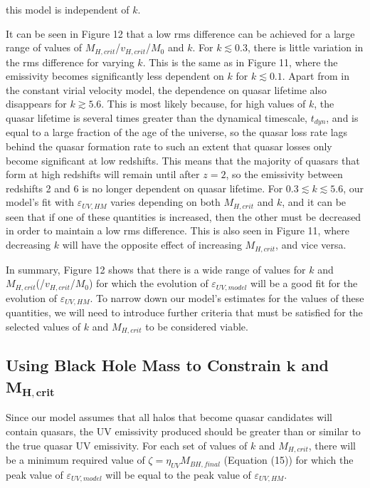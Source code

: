 \documentclass[12pt, twocolumn]{article}%
\begin{document}
\noindent this model is independent of $k$.\par

It can be seen in Figure 12 that a low rms difference can be achieved for a large range of values of $M_{H,crit}$/$v_{H,crit}$/$M_0$ and $k$. For $k\lesssim0.3$, there is little variation in the rms difference for varying $k$. This is the same as in Figure 11, where the emissivity becomes significantly less dependent on $k$ for $k\lesssim0.1$. Apart from in the constant virial velocity model, the dependence on quasar lifetime also disappears for $k\gtrsim5.6$. This is most likely because, for high values of $k$, the quasar lifetime is several times greater than the dynamical timescale, $t_{dyn}$, and is equal to a large fraction of the age of the universe, so the quasar loss rate lags behind the quasar formation rate to such an extent that quasar losses only become significant at low redshifts. This means that the majority of quasars that form at high redshifts will remain until after $z=2$, so the emissivity between redshifts 2 and 6 is no longer dependent on quasar lifetime. For $0.3\lesssim k\lesssim5.6$, our model's fit with $\varepsilon_{UV,HM}$ varies depending on both $M_{H,crit}$ and $k$, and it can be seen that if one of these quantities is increased, then the other must be decreased in order to maintain a low rms difference. This is also seen in Figure 11, where decreasing $k$ will have the opposite effect of increasing $M_{H,crit}$, and vice versa.\par

In summary, Figure 12 shows that there is a wide range of values for $k$ and $M_{H,crit}$(/$v_{H,crit}$/$M_0$) for which the evolution of $\varepsilon_{UV,model}$ will be a good fit for the evolution of $\varepsilon_{UV,HM}$. To narrow down our model's estimates for the values of these quantities, we will need to introduce further criteria that must be satisfied for the selected values of $k$ and $M_{H,crit}$ to be considered viable.

\subsection{Using Black Hole Mass to Constrain $\bm{k}$ and $\bm{M_{H,crit}}$}

Since our model assumes that all halos that become quasar candidates will contain quasars, the UV emissivity produced should be greater than or similar to the true quasar UV emissivity. For each set of values of $k$ and $M_{H,crit}$, there will be a minimum required value of $\zeta=\eta_{UV}M_{BH,final}$ (Equation (15)) for which the peak value of $\varepsilon_{UV,model}$ will be equal to the peak value of $\varepsilon_{UV,HM}$.
\end{document}
